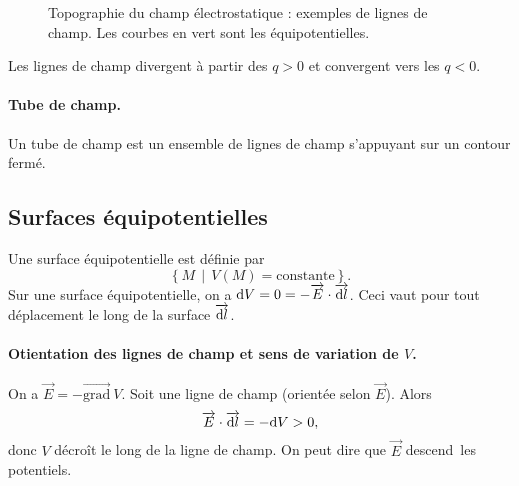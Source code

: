 \begin{figure}
            \caption[Topographie du champ électrostatique : exemples de lignes de champ.]{Topographie du champ électrostatique : exemples de lignes de champ. Les courbes en vert sont les équipotentielles.}
            \label{fig:ligne_de_champ_electrostatique}
        \end{figure}

        Les lignes de champ divergent à partir des $q>0$ et convergent vers les $q<0$.

        \paragraph{Tube de champ.}
        Un tube de champ est un ensemble de lignes de champ s'appuyant sur un contour fermé.

    \subsection{Surfaces équipotentielles}

        Une surface équipotentielle est définie par
        \begin{equation*}
            \left\lbrace M\,\middle|\, V(M)=\text{constante}\right\rbrace.
        \end{equation*}
        Sur une surface équipotentielle, on a $\mathrm{d} V=0=-\protect\overrightarrow{{E}}\cdot\protect\overrightarrow{{\mathrm{d} l}}$. Ceci vaut pour tout déplacement le long de la surface $\protect\overrightarrow{{\mathrm{d} l}}$.

        \paragraph{Otientation des lignes de champ et sens de variation de $V$.}
        On a $\vec{E}=-\vec{\text{grad}}~V$. Soit une ligne de champ (orientée selon $\vec{E}$). Alors 
        \begin{equation*}
            \protect\overrightarrow{{E}}\cdot\protect\overrightarrow{{\mathrm{d} l}}=-\mathrm{d} V>0,
        \end{equation*}
        donc $V$ décroît le long de la ligne de champ. On peut dire que $\vec{E}$ \og descend\fg~les potentiels.

